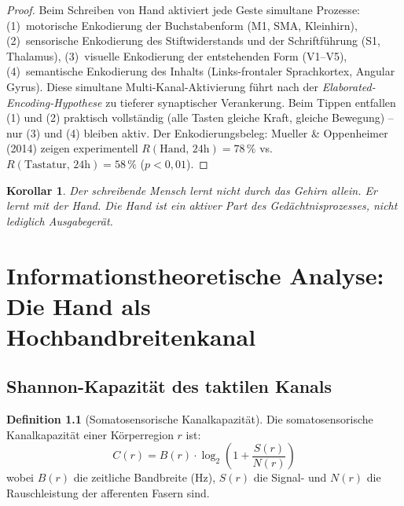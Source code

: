 ﻿\documentclass[12pt,a4paper]{report}
\theoremstyle{plain}
\newtheorem{korollar}[theorem]{Korollar}
\theoremstyle{definition}
\newtheorem{definition}[theorem]{Definition}
\theoremstyle{remark}
\begin{document}
\begin{proof}
Beim Schreiben von Hand aktiviert jede Geste simultane Prozesse:
(1)~motorische Enkodierung der Buchstabenform (M1, SMA, Kleinhirn),
(2)~sensorische Enkodierung des Stiftwiderstands und der Schriftführung
(S1, Thalamus), (3)~visuelle Enkodierung der entstehenden Form (V1--V5),
(4)~semantische Enkodierung des Inhalts (Links-frontaler Sprachkortex,
Angular Gyrus). Diese simultane Multi-Kanal-Aktivierung führt nach der
\emph{Elaborated-Encoding-Hypothese} \cite{craik1972} zu tieferer
synaptischer Verankerung. Beim Tippen entfallen (1) und (2) praktisch
vollständig (alle Tasten gleiche Kraft, gleiche Bewegung) -- nur
(3) und (4) bleiben aktiv. Der Enkodierungsbeleg: Mueller \& Oppenheimer
(2014) zeigen experimentell $R(\text{Hand, 24h}) = 78\,\%$ vs.\
$R(\text{Tastatur, 24h}) = 58\,\%$ ($p < 0{,}01$).
\end{proof}

\begin{korollar}
Der schreibende Mensch lernt nicht durch das Gehirn allein.
Er lernt \emph{mit der Hand}. Die Hand ist ein aktiver Part
des Gedächtnisprozesses, nicht lediglich Ausgabegerät.
\end{korollar}

\chapter{Informationstheoretische Analyse: Die Hand als Hochbandbreitenkanal}
\label{chap:information}

\section{Shannon-Kapazität des taktilen Kanals}

\begin{definition}[Somatosensorische Kanalkapazität]
Die somatosensorische Kanalkapazität einer Körperregion $r$ ist:
\[
  C(r) = B(r) \cdot \log_2\!\left(1 + \frac{S(r)}{N(r)}\right)
\]
wobei $B(r)$ die zeitliche Bandbreite (Hz), $S(r)$ die Signal- und
$N(r)$ die Rauschleistung der afferenten Fasern sind.
\end{definition}
\end{document}
